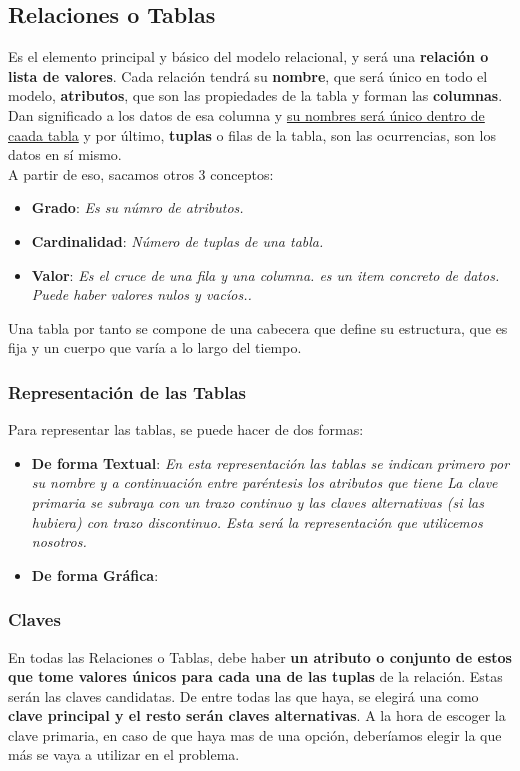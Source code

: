 \documentclass{article}
\begin{document}
\subsection{Relaciones o Tablas}
Es el elemento principal y básico del modelo relacional, y será una \textbf{relación o lista de valores}. Cada relación tendrá su \textbf{nombre}, que será único 
en todo el modelo, \textbf{atributos}, que son las propiedades de la tabla y forman las \textbf{columnas}. Dan significado a los datos de esa columna y \underline{su nombres
será único dentro de caada tabla} y por último, \textbf{tuplas} o filas de la tabla, son las ocurrencias, son los datos en sí mismo. 
\\
A partir de eso, sacamos otros 3 conceptos:
\\
  \begin{itemize}
    \item \textbf{Grado}: \textit{Es su númro de atributos.}
    \item \textbf{Cardinalidad}: \textit{Número de tuplas de una tabla.}
    \item \textbf{Valor}: \textit{Es el cruce de una fila y una columna. es un item concreto de datos. Puede haber valores nulos y vacíos..}
  \end{itemize}

\newpage
Una tabla por tanto se compone de una cabecera que define su estructura, que es fija y un cuerpo que varía a lo largo del tiempo.
\\
\subsubsection{Representación de las Tablas}
Para representar las tablas, se puede hacer de dos formas:
\\
  \begin{itemize}
    \item \textbf{De forma Textual}: \textit{En esta representación las tablas se indican primero por su nombre y a continuación entre paréntesis los atributos que tiene 
    La clave primaria se subraya con un trazo continuo y las claves alternativas (si las hubiera) con trazo discontinuo. Esta será la representación
    que utilicemos nosotros.}
    \item \textbf{De forma Gráfica}:
  \end{itemize}
\subsubsection{Claves}
En todas las Relaciones o Tablas, debe haber \textbf{un atributo o conjunto de estos que tome valores únicos para cada una de las tuplas} de la relación. Estas
serán las claves candidatas. De entre todas las que haya, se elegirá una como \textbf{clave principal y el resto serán claves alternativas}. A la hora de escoger
la clave primaria, en caso de que haya mas de una opción, deberíamos elegir la que más se vaya a utilizar en el problema.
\end{document}
